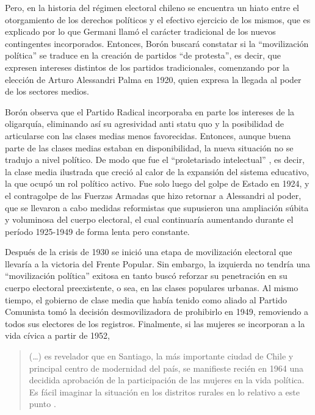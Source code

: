 Pero, en la historia del régimen electoral chileno se encuentra un hiato entre el otorgamiento de los derechos políticos y el efectivo ejercicio de los mismos, que es explicado por lo que Germani llamó el carácter tradicional de los nuevos contingentes incorporados. Entonces, Borón buscará constatar si la \enquote{movilización política} se traduce en la creación de partidos \enquote{de protesta}, es decir, que expresen intereses distintos de los partidos tradicionales, comenzando por la elección de Arturo Alessandri Palma en 1920, quien expresa la llegada al poder de los sectores medios.

Borón observa que el Partido Radical incorporaba en parte los intereses de la oligarquía, eliminando así su agresividad anti statu quo y la posibilidad de articularse con las clases medias menos favorecidas. Entonces, aunque buena parte de las clases medias estaban en disponibilidad, la nueva situación no se tradujo a nivel político. De modo que fue el \enquote{proletariado intelectual} \parencite[15]{1571-BORON1970}, es decir, la clase media ilustrada que creció al calor de la expansión del sistema educativo, la que ocupó un rol político activo. Fue solo luego del golpe de Estado en 1924, y el contragolpe de las Fuerzas Armadas que hizo retornar a Alessandri al poder, que se llevaron a cabo medidas reformistas que supusieron una ampliación súbita y voluminosa del cuerpo electoral, el cual continuaría aumentando durante el período 1925-1949 de forma lenta pero constante.

Después de la crisis de 1930 se inició una etapa de movilización electoral que llevaría a la victoria del Frente Popular. Sin embargo, la izquierda no tendría una \enquote{movilización política} exitosa en tanto buscó reforzar su penetración en su cuerpo electoral preexistente, o sea, en las clases populares urbanas. Al mismo tiempo, el gobierno de clase media que había tenido como aliado al Partido Comunista tomó la decisión desmovilizadora de prohibirlo en 1949, removiendo a todos sus electores de los registros. Finalmente, si las mujeres se incorporan a la vida cívica a partir de 1952,

\begin{quote}
(\dots) es revelador que en Santiago, la más importante ciudad de Chile y principal centro de modernidad del país, se manifieste recién en 1964 una decidida aprobación de la participación de las mujeres en la vida política. Es fácil imaginar la situación en los distritos rurales en lo relativo a este punto \parencite[27]{1571-BORON1970}.
\end{quote}

